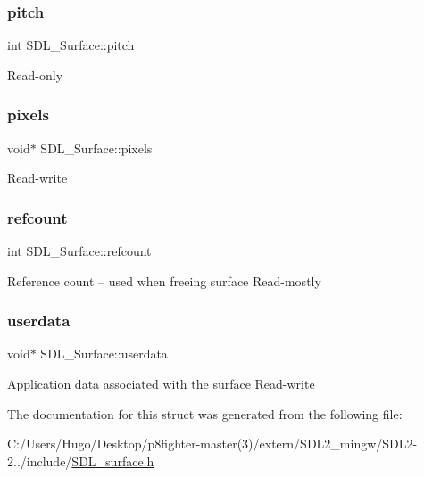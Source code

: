 \subsubsection{\texorpdfstring{pitch}{pitch}}
{\footnotesize\ttfamily int S\+D\+L\+\_\+\+Surface\+::pitch}

Read-\/only \mbox{\label{struct_s_d_l___surface_abd9597e0e084b8ef33fe0397bc26d911}} 
\subsubsection{\texorpdfstring{pixels}{pixels}}
{\footnotesize\ttfamily void$\ast$ S\+D\+L\+\_\+\+Surface\+::pixels}

Read-\/write \mbox{\label{struct_s_d_l___surface_a03d10628a359c0674f5ceffd574f1641}} 
\subsubsection{\texorpdfstring{refcount}{refcount}}
{\footnotesize\ttfamily int S\+D\+L\+\_\+\+Surface\+::refcount}

Reference count -- used when freeing surface Read-\/mostly \mbox{\label{struct_s_d_l___surface_ae66d973dcb9b57cb34815892e1ee1f31}} 
\subsubsection{\texorpdfstring{userdata}{userdata}}
{\footnotesize\ttfamily void$\ast$ S\+D\+L\+\_\+\+Surface\+::userdata}

Application data associated with the surface Read-\/write 

The documentation for this struct was generated from the following file\+:\begin{DoxyCompactItemize}
\item 
C\+:/\+Users/\+Hugo/\+Desktop/p8fighter-\/master(3)/extern/\+S\+D\+L2\+\_\+mingw/\+S\+D\+L2-\/2../include/\hyperlink{_s_d_l__surface_8h}{S\+D\+L\+\_\+surface.\+h}\end{DoxyCompactItemize}
